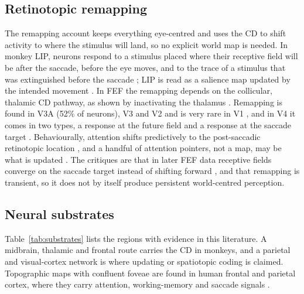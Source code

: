 \documentclass[14pt]{article}
\begin{document}
\subsection{Retinotopic remapping}

The remapping account keeps everything eye-centred and uses the CD to shift activity to where the stimulus will land, so no explicit world map is needed.
In monkey LIP, neurons respond to a stimulus placed where their receptive field will be after the saccade, before the eye moves, and to the trace of a stimulus that was extinguished before the saccade \citep{duhamelUpdatingRepresentationVisual1992}; LIP is read as a salience map updated by the intended movement \citep{colbySpaceAttentionParietal1999}.
In FEF the remapping depends on the collicular, thalamic CD pathway, as shown by inactivating the thalamus \citep{sommerInfluenceThalamusSpatial2006}.
Remapping is found in V3A (52\% of neurons), V3 and V2 and is very rare in V1 \citep{nakamuraUpdatingVisualRepresentation2002}, and in V4 it comes in two types, a response at the future field and a response at the saccade target \citep{neupaneTwoDistinctTypes2016}.
Behaviourally, attention shifts predictively to the post-saccadic retinotopic location \citep{rolfsPredictiveRemappingAttention2011}, and a handful of attention pointers, not a map, may be what is updated \citep{cavanaghVisualStabilityBased2010}.
The critiques are that in later FEF data receptive fields converge on the saccade target instead of shifting forward \citep{zirnsakVisualSpaceCompressed2014}, and that remapping is transient, so it does not by itself produce persistent world-centred perception.

\subsection{Neural substrates}

Table~\ref{tab:substrates} lists the regions with evidence in this literature.
A midbrain, thalamic and frontal route carries the CD in monkeys, and a parietal and visual-cortex network is where updating or spatiotopic coding is claimed.
Topographic maps with confluent foveae are found in human frontal and parietal cortex, where they carry attention, working-memory and saccade signals \citep{silverTopographicMapsHuman2009,mackeyVisualFieldMap2017}.
\end{document}

